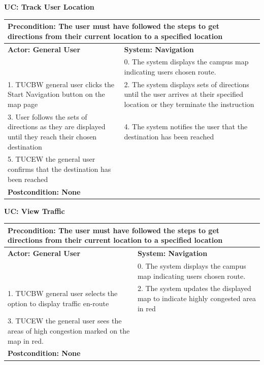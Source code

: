 \documentclass{article}
\begin{document}
{\noindent\textbf{UC: Track User Location}
\begin{flushleft}
\begin{tabular}{ |p{}|p{}| }
  \hline
  \multicolumn{2}{|p{\textwidth}|}{\textbf{Precondition:} The user must have followed the steps to get directions from their current location to a specified location} \\
  \hline
  \textbf{Actor: General User}  & \textbf{System: Navigation} \\
   \hline
   & 0. The system displays the campus map indicating users chosen route. \\
  \hline
  1. TUCBW general user clicks the Start Navigation button on the map page& 2. The system displays sets of directions until the user arrives at their specified location or they terminate the instruction\\
  \hline
  3. User follows the sets of directions as they are displayed until they reach their chosen destination& 4. The system notifies the user that the destination has been reached\\
  \hline
  5. TUCEW the general user confirms that the destination has been reached& \\
  \hline
  \multicolumn{2}{|p{\textwidth}|}{\textbf{Postcondition: None}} \\
   \hline
\end{tabular}
\end{flushleft}

\bigskip
\bigskip

\noindent\textbf{UC: View Traffic}
\begin{flushleft}
\begin{tabular}{ |p{}|p{}| }
  \hline
  \multicolumn{2}{|p{\textwidth}|}{\textbf{Precondition:} The user must have followed the steps to get directions from their current location to a specified location} \\
  \hline
  \textbf{Actor: General User}  & \textbf{System: Navigation} \\
   \hline
   & 0. The system displays the campus map indicating users chosen route. \\
  \hline
  1. TUCBW general user selects the option to display traffic en-route & 2. The system updates the displayed map to indicate highly congested area in red\\
  \hline
  3. TUCEW the general user sees the areas of high congestion marked on the map in red.&\\
  \hline
  \multicolumn{2}{|p{\textwidth}|}{\textbf{Postcondition: None}} \\
   \hline
\end{tabular}
\end{flushleft}
}
\end{document}
